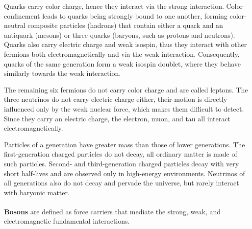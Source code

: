 Quarks carry color charge, hence they interact via the strong interaction. Color confinement leads to quarks being strongly bound to one another, forming color-neutral composite particles (hadrons) that contain either a quark and an antiquark (mesons) or three quarks (baryons, such as protons and neutrons). Quarks also carry electric charge and weak isospin, thus they interact with other fermions both electromagnetically and via the weak interaction. Consequently, quarks of the same generation form a weak isospin doublet, where they behave similarly towards the weak interaction.

The remaining six fermions do not carry color charge and are called leptons. The three neutrinos do not carry electric charge either, their motion is directly influenced only by the weak nuclear force, which makes them difficult to detect. Since they carry an electric charge, the electron, muon, and tau all interact electromagnetically.

Particles of a generation have greater mass than those of lower generations. The first-generation charged particles do not decay, all ordinary matter is made of such particles. Second- and third-generation charged particles decay with very short half-lives and are observed only in high-energy environments. Neutrinos of all generations also do not decay and pervade the universe, but rarely interact with baryonic matter.\\ \\
\textbf{Bosons} are defined as force carriers that mediate the strong, weak, and electromagnetic fundamental interactions.

